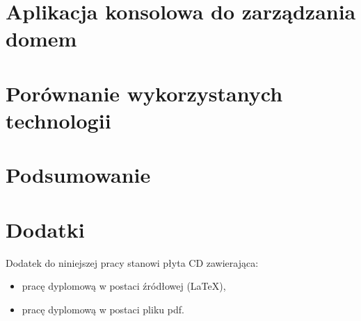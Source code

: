 \documentclass[11pt, a4paper,polish,twoside]{report}
\numberwithin{equation}{section}
\begin{document}
\chapter{Aplikacja konsolowa do zarządzania domem} \label{aplikacja_zarzadzanie}


\chapter{Porównanie wykorzystanych technologii}



\chapter{Podsumowanie}



%

\nocite{*}
\printbibliography 


\chapter*{Dodatki}
Dodatek do niniejszej pracy stanowi płyta CD zawierająca:
\begin{itemize}
\item pracę dyplomową w postaci źródłowej (LaTeX),
\item pracę dyplomową w postaci pliku pdf.
\end{itemize}

\newpage
{}	
\listoffigures

\newpage
{}	
\listoftables

\newpage
{}	


\end{document}
